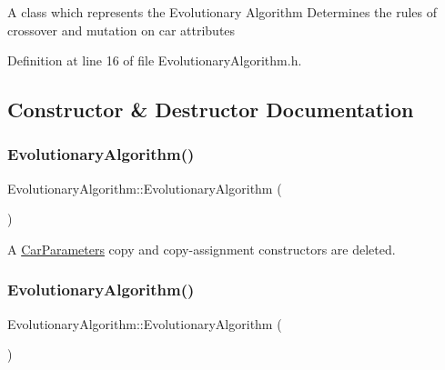 A class which represents the Evolutionary Algorithm Determines the rules of crossover and mutation on car attributes 

Definition at line 16 of file Evolutionary\+Algorithm.\+h.



\subsection{Constructor \& Destructor Documentation}
\mbox{\label{classEvolutionaryAlgorithm_ae93cddd09649e8077b553c09919542b4}} 
\subsubsection{\texorpdfstring{Evolutionary\+Algorithm()}{EvolutionaryAlgorithm()}\hspace{0.1cm}{\footnotesize\ttfamily [1/2]}}
{\footnotesize\ttfamily Evolutionary\+Algorithm\+::\+Evolutionary\+Algorithm (\begin{DoxyParamCaption}\item[{const \hyperlink{classEvolutionaryAlgorithm}{Evolutionary\+Algorithm} \&}]{ }\end{DoxyParamCaption})\hspace{0.3cm}{\ttfamily [delete]}}



A \hyperlink{classCarParameters}{Car\+Parameters} copy and copy-\/assignment constructors are deleted. 

\mbox{\label{classEvolutionaryAlgorithm_a7a37fb1cdb3f585529af74dec4d0bf8d}} 
\subsubsection{\texorpdfstring{Evolutionary\+Algorithm()}{EvolutionaryAlgorithm()}\hspace{0.1cm}{\footnotesize\ttfamily [2/2]}}
{\footnotesize\ttfamily Evolutionary\+Algorithm\+::\+Evolutionary\+Algorithm (\begin{DoxyParamCaption}{ }\end{DoxyParamCaption})\hspace{0.3cm}{\ttfamily [private]}}



